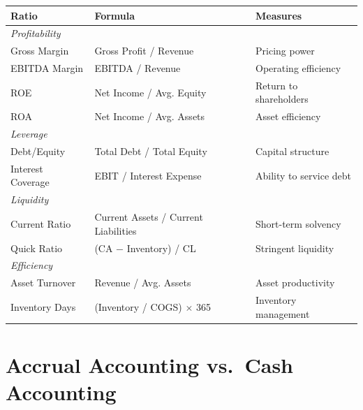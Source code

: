 \documentclass[oneside]{book}
\begin{document}
\begin{center}
\begin{tabularx}{\linewidth}{lXl}
\toprule
\textbf{Ratio} & \textbf{Formula} & \textbf{Measures} \\
\midrule
\multicolumn{3}{l}{\textit{Profitability}} \\
Gross Margin     & Gross Profit / Revenue                          & Pricing power \\
EBITDA Margin    & EBITDA / Revenue                                & Operating efficiency \\
ROE              & Net Income / Avg. Equity                        & Return to shareholders \\
ROA              & Net Income / Avg. Assets                        & Asset efficiency \\
\midrule
\multicolumn{3}{l}{\textit{Leverage}} \\
Debt/Equity      & Total Debt / Total Equity                       & Capital structure \\
Interest Coverage & EBIT / Interest Expense                        & Ability to service debt \\
\midrule
\multicolumn{3}{l}{\textit{Liquidity}} \\
Current Ratio    & Current Assets / Current Liabilities            & Short-term solvency \\
Quick Ratio      & (CA $-$ Inventory) / CL                        & Stringent liquidity \\
\midrule
\multicolumn{3}{l}{\textit{Efficiency}} \\
Asset Turnover   & Revenue / Avg. Assets                           & Asset productivity \\
Inventory Days   & (Inventory / COGS) $\times$ 365                 & Inventory management \\
\bottomrule
\end{tabularx}
\end{center}


\section{Accrual Accounting vs.\ Cash Accounting}
\end{document}

